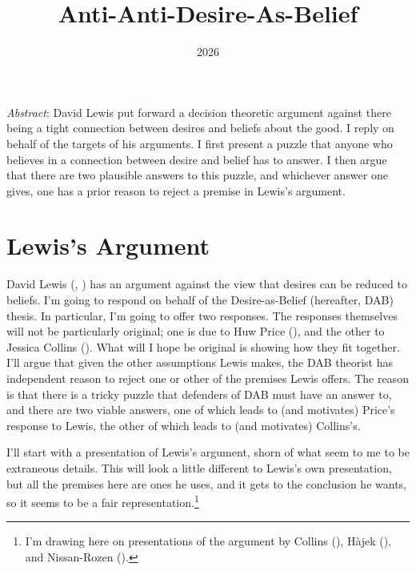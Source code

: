 \documentclass[
  11pt,
  letterpaper,
  DIV=11,
  numbers=noendperiod,
  twoside]{scrartcl}
\title{Anti-Anti-Desire-As-Belief}
\author{}
\date{2026}
\renewenvironment{abstract}
 {\vspace{-1.25cm}
 \quotation\small\noindent\emph{Abstract}:}
 {\endquotation}
\renewenvironment{abstract}
 {\quotation\small\noindent\emph{Abstract}:}
 {\endquotation\vspace{-0.02cm}}
\begin{document}
\maketitle
\begin{abstract}
David Lewis put forward a decision theoretic argument against there
being a tight connection between desires and beliefs about the good. I
reply on behalf of the targets of his arguments. I first present a
puzzle that anyone who believes in a connection between desire and
belief has to answer. I then argue that there are two plausible answers
to this puzzle, and whichever answer one gives, one has a prior reason
to reject a premise in Lewis's argument.
\end{abstract}


\section{Lewis's Argument}\label{sec-lewis}

David Lewis (,
) has an argument against the view that
desires can be reduced to beliefs. I'm going to respond on behalf of the
Desire-as-Belief (hereafter, DAB) thesis. In particular, I'm going to
offer two responses. The responses themselves will not be particularly
original; one is due to Huw Price (), and
the other to Jessica Collins (). What
will I hope be original is showing how they fit together. I'll argue
that given the other assumptions Lewis makes, the DAB theorist has
independent reason to reject one or other of the premises Lewis offers.
The reason is that there is a tricky puzzle that defenders of DAB must
have an answer to, and there are two viable answers, one of which leads
to (and motivates) Price's response to Lewis, the other of which leads
to (and motivates) Collins's.

I'll start with a presentation of Lewis's argument, shorn of what seem
to me to be extraneous details. This will look a little different to
Lewis's own presentation, but all the premises here are ones he uses,
and it gets to the conclusion he wants, so it seems to be a fair
representation.\footnote{I'm drawing here on presentations of the
  argument by Collins (), Hàjek
  (), and Nissan-Rozen
  ().}
\end{document}
